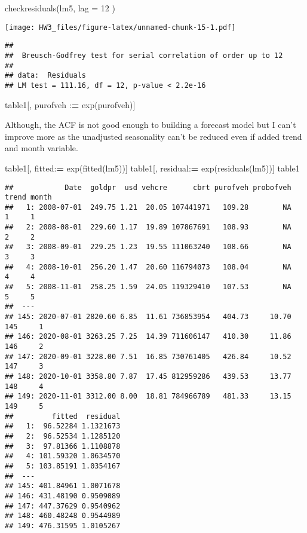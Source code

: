 \documentclass[
]{article}
\newenvironment{Shaded}{\begin{snugshade}}{\end{snugshade}}
\newcommand{\AttributeTok}[1]{\textcolor[rgb]{0.77,0.63,0.00}{#1}}
\newcommand{\DecValTok}[1]{\textcolor[rgb]{0.00,0.00,0.81}{#1}}
\newcommand{\ErrorTok}[1]{\textcolor[rgb]{0.64,0.00,0.00}{\textbf{#1}}}
\newcommand{\FunctionTok}[1]{\textcolor[rgb]{0.00,0.00,0.00}{#1}}
\newcommand{\NormalTok}[1]{#1}
\newcommand{\SpecialCharTok}[1]{\textcolor[rgb]{0.00,0.00,0.00}{#1}}
\begin{document}
\begin{Shaded}
\begin{Highlighting}[]
\FunctionTok{checkresiduals}\NormalTok{(lm5, }\AttributeTok{lag =} \DecValTok{12}\NormalTok{ )}
\end{Highlighting}
\end{Shaded}

\texttt{[image: HW3\_files/figure-latex/unnamed-chunk-15-1.pdf]}

\begin{verbatim}
## 
##  Breusch-Godfrey test for serial correlation of order up to 12
## 
## data:  Residuals
## LM test = 111.16, df = 12, p-value < 2.2e-16
\end{verbatim}

\begin{Shaded}
\begin{Highlighting}[]
\NormalTok{table1[, purofveh }\SpecialCharTok{:}\ErrorTok{=} \FunctionTok{exp}\NormalTok{(purofveh)]}
\end{Highlighting}
\end{Shaded}

Although, the ACF is not good enough to building a forecast model but I
can't improve more as the unadjusted seasonality can't be reduced even
if added trend and month variable.

\begin{Shaded}
\begin{Highlighting}[]
\NormalTok{table1[, fitted}\SpecialCharTok{:}\ErrorTok{=} \FunctionTok{exp}\NormalTok{(}\FunctionTok{fitted}\NormalTok{(lm5))]}
\NormalTok{table1[, residual}\SpecialCharTok{:}\ErrorTok{=} \FunctionTok{exp}\NormalTok{(}\FunctionTok{residuals}\NormalTok{(lm5))]}
\NormalTok{table1}
\end{Highlighting}
\end{Shaded}

\begin{verbatim}
##            Date  goldpr  usd vehcre      cbrt purofveh probofveh trend month
##   1: 2008-07-01  249.75 1.21  20.05 107441971   109.28        NA     1     1
##   2: 2008-08-01  229.60 1.17  19.89 107867691   108.93        NA     2     2
##   3: 2008-09-01  229.25 1.23  19.55 111063240   108.66        NA     3     3
##   4: 2008-10-01  256.20 1.47  20.60 116794073   108.04        NA     4     4
##   5: 2008-11-01  258.25 1.59  24.05 119329410   107.53        NA     5     5
##  ---                                                                        
## 145: 2020-07-01 2820.60 6.85  11.61 736853954   404.73     10.70   145     1
## 146: 2020-08-01 3263.25 7.25  14.39 711606147   410.30     11.86   146     2
## 147: 2020-09-01 3228.00 7.51  16.85 730761405   426.84     10.52   147     3
## 148: 2020-10-01 3358.80 7.87  17.45 812959286   439.53     13.77   148     4
## 149: 2020-11-01 3312.00 8.00  18.81 784966789   481.33     13.15   149     5
##         fitted  residual
##   1:  96.52284 1.1321673
##   2:  96.52534 1.1285120
##   3:  97.81366 1.1108878
##   4: 101.59320 1.0634570
##   5: 103.85191 1.0354167
##  ---                    
## 145: 401.84961 1.0071678
## 146: 431.48190 0.9509089
## 147: 447.37629 0.9540962
## 148: 460.48248 0.9544989
## 149: 476.31595 1.0105267
\end{verbatim}
\end{document}
